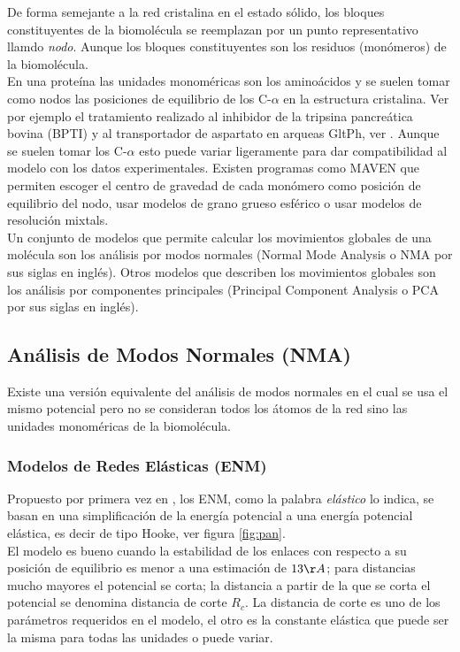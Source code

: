 De forma semejante a la red cristalina en el estado s\'{o}lido, los bloques constituyentes de la biomol\'{e}cula se reemplazan  por un punto representativo llamdo \textit{nodo}. Aunque los bloques constituyentes son los residuos (mon\'{o}meros) de la biomol\'{e}cula.\\

En una prote\'{i}na las unidades monom\'{e}ricas son los amino\'{a}cidos y  se suelen tomar como nodos las posiciones de equilibrio de los C-$\alpha$ en la estructura cristalina. Ver por ejemplo el tratamiento realizado al inhibidor de la tripsina pancre\'{a}tica bovina (BPTI) y al transportador de aspartato en arqueas GltPh, ver \cite{Gur2013}. Aunque se suelen tomar los C-$\alpha$ esto puede variar ligeramente para dar compatibilidad al modelo con los datos experimentales. Existen programas como MAVEN \cite{Zimmermann2011} que permiten escoger el centro de gravedad de cada mon\'{o}mero como posici\'{o}n de equilibrio del nodo, usar modelos de grano grueso esf\'{e}rico o usar modelos de resoluci\'{o}n mixtals.\\
Un conjunto de modelos que permite calcular los movimientos globales de una mol\'{e}cula son los an\'{a}lisis por modos normales (Normal Mode Analysis o NMA por sus siglas en ingl\'{e}s).
 Otros modelos que describen los movimientos globales son los an\'{a}lisis por componentes principales (Principal Component Analysis o PCA por sus siglas en ingl\'{e}s).
 \subsection{An\'{a}lisis de Modos Normales (NMA)}
Existe una versi\'{o}n equivalente del an\'{a}lisis de modos normales en el cual se usa el mismo potencial pero no se consideran todos los \'{a}tomos de la red sino las unidades monom\'{e}ricas de la biomol\'{e}cula.
\subsubsection{Modelos de Redes El\'{a}sticas (ENM)}
Propuesto por primera vez en \cite{Tirion1996}, los ENM, como la palabra \textit{el\'{a}stico} lo indica, se basan en una simplificaci\'{o}n de la energ\'{i}a potencial a una energ\'{i}a potencial el\'{a}stica, es decir de tipo Hooke, ver figura \ref{fig:pan}.\\



El modelo es bueno cuando la estabilidad de los enlaces con respecto a su posici\'{o}n de equilibrio es menor a una estimaci\'{o}n  de $13\AA$; para distancias mucho mayores el potencial se corta; la distancia a partir de la que se corta el potencial se denomina distancia de corte $R_c$. La distancia de corte es uno de los par\'{a}metros requeridos en el modelo, el otro es la constante el\'{a}stica que puede ser la misma para todas las unidades o puede variar.\\

